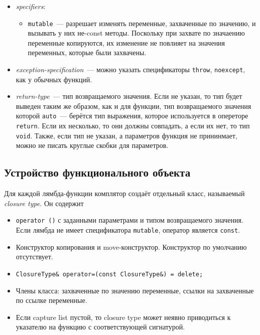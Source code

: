 \begin{itemize}
    \item \emph{specifiers}:
    \begin{itemize}
        \item \texttt{mutable}~--- разрешает изменять переменные, захваченные по значению, и вызывать у них
        не-const методы. Поскольку при захвате по значаению переменные копируются, их изменение не повлияет на значения
        переменных, которые были захвачены.
    \end{itemize}
    \item \emph{exception-specification}~--- можно указать спецификаторы \texttt{throw}, \texttt{noexcept},
    как у обычных функций.
    \item \emph{return-type}~--- тип возвращаемого значения. Если не указан, то тип будет выведен таким же образом,
    как и для функции, тип возвращаемого значения которой \texttt{auto}~--- берётся тип выражения,
    которое используется в опереторе \texttt{return}. Если их несколько, то они должны совпадать, а если их нет,
    то тип \texttt{void}.
    Также, если тип не указан, а параметров функция не прининмает, можно не писать круглые скобки для параметров.
\end{itemize}

\subsection{Устройство функционального объекта}
Для каждой лямбда-функции комплятор создаёт отдельный класс, называемый \emph{closure type}. Он содержит

\begin{itemize}
    \item \texttt{operator ()} с заданными параметрами и типом возвращаемого значения.
    Если лямбда не имеет спецификатора \texttt{mutable}, оператор является \texttt{const}.
    \item Конструктор копирования и move-конструктор. Конструктор по умолчанию отсутствует.
    \item \texttt{ClosureType& operator=(const ClosureType&) = delete;}
    \item Члены класса: захваченные по значению переменные, ссылки на захваченные по ссылке переменные.
    \item Если capture list пустой, то closure type может неявно приводиться к указателю на функцию с соответствующей сигнатурой.
\end{itemize}


